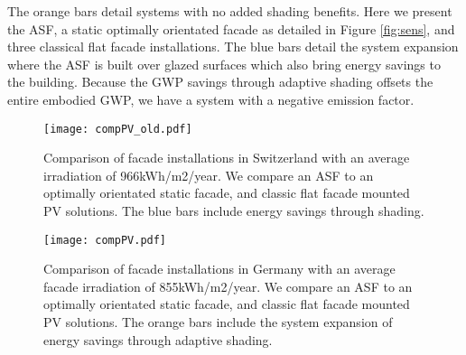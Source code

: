 The orange bars detail systems with no added shading benefits. Here we present the ASF, a static optimally orientated facade as detailed in Figure \ref{fig:sens}, and three classical flat facade installations.  
The blue bars detail the system expansion where the ASF is built over glazed surfaces which also bring energy savings to the building. Because the GWP savings through adaptive shading offsets the entire embodied GWP, we have a system with a negative emission factor.




\begin{figure}[H]
\begin{center}
\begin{mdframed}[linecolor=magenta, linewidth=2pt]
\texttt{[image: compPV\_old.pdf]}
\caption{Comparison of facade installations in Switzerland with an average irradiation of 966kWh/m2/year.
We compare an ASF to an optimally orientated static facade, and classic flat facade mounted PV solutions. The blue bars include energy savings through shading.}
\label{fig:compPV_old}
\end{mdframed}
\end{center}
\end{figure}

\begin{figure}[H]
\begin{center}
\begin{mdframed}[linecolor=cyan, linewidth=2pt]
\texttt{[image: compPV.pdf]}
\caption{Comparison of facade installations in Germany with an average facade irradiation of 855kWh/m2/year.
We compare an ASF to an optimally orientated static facade, and classic flat facade mounted PV solutions. The orange bars include the system expansion of energy savings through adaptive shading.}
\label{fig:compPV}
\end{mdframed}
\end{center}
\end{figure}

